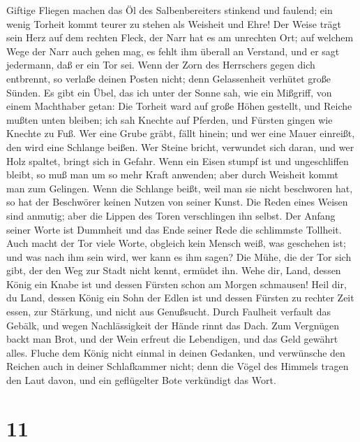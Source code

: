  Giftige Fliegen machen das Öl des Salbenbereiters
stinkend und faulend; ein wenig Torheit kommt teurer zu stehen als
Weisheit und Ehre!  Der Weise trägt sein Herz auf dem
rechten Fleck, der Narr hat es am unrechten Ort;  auf
welchem Wege der Narr auch gehen mag, es fehlt ihm überall an Verstand,
und er sagt jedermann, daß er ein Tor sei.  Wenn der Zorn
des Herrschers gegen dich entbrennt, so verlaße deinen Posten nicht;
denn Gelassenheit verhütet große Sünden.  Es gibt ein
Übel, das ich unter der Sonne sah, wie ein Mißgriff, von einem
Machthaber getan:  Die Torheit ward auf große Höhen
gestellt, und Reiche mußten unten bleiben;  ich sah
Knechte auf Pferden, und Fürsten gingen wie Knechte zu Fuß.
 Wer eine Grube gräbt, fällt hinein; und wer eine Mauer
einreißt, den wird eine Schlange beißen.  Wer Steine
bricht, verwundet sich daran, und wer Holz spaltet, bringt sich in
Gefahr.  Wenn ein Eisen stumpf ist und ungeschliffen
bleibt, so muß man um so mehr Kraft anwenden; aber durch Weisheit kommt
man zum Gelingen.  Wenn die Schlange beißt, weil man sie
nicht beschworen hat, so hat der Beschwörer keinen Nutzen von seiner
Kunst.  Die Reden eines Weisen sind anmutig; aber die
Lippen des Toren verschlingen ihn selbst.  Der Anfang
seiner Worte ist Dummheit und das Ende seiner Rede die schlimmste
Tollheit.  Auch macht der Tor viele Worte, obgleich kein
Mensch weiß, was geschehen ist; und was nach ihm sein wird, wer kann es
ihm sagen?  Die Mühe, die der Tor sich gibt, der den Weg
zur Stadt nicht kennt, ermüdet ihn.  Wehe dir, Land,
dessen König ein Knabe ist und dessen Fürsten schon am Morgen schmausen!
 Heil dir, du Land, dessen König ein Sohn der Edlen ist
und dessen Fürsten zu rechter Zeit essen, zur Stärkung, und nicht aus
Genußsucht.  Durch Faulheit verfault das Gebälk, und
wegen Nachlässigkeit der Hände rinnt das Dach.  Zum
Vergnügen backt man Brot, und der Wein erfreut die Lebendigen, und das
Geld gewährt alles.  Fluche dem König nicht einmal in
deinen Gedanken, und verwünsche den Reichen auch in deiner Schlafkammer
nicht; denn die Vögel des Himmels tragen den Laut davon, und ein
geflügelter Bote verkündigt das Wort.

\hypertarget{section-10}{%
\section{11}\label{section-10}}


